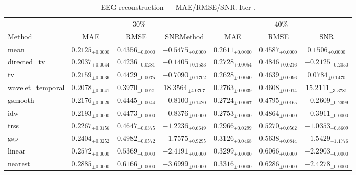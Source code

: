 ﻿%
\begin{table}[ht]
\centering
\caption[EEG reconstruction - Iteration it20]{EEG reconstruction — MAE/RMSE/SNR. Iter .}
\label{tab:main_it20_synthetic_alpha_high_missing}
\small
\begin{tabular}{lcccccc}
\toprule
\multicolumn{1}{c}{} & \multicolumn{3}{c}{30\%} & \multicolumn{3}{c}{40\%} \\
\cmidrule(lr){2-4} \cmidrule(lr){5-7}
Method & MAE & RMSE & SNRMethod & MAE & RMSE & SNR \\
\midrule
mean & $0.2125_{\pm 0.0000}$ & $0.4356_{\pm 0.0000}$ & $-0.5475_{\pm 0.0000}$ & $0.2611_{\pm 0.0000}$ & $0.4587_{\pm 0.0000}$ & $0.1506_{\pm 0.0000}$ \\
directed\_tv & $0.2037_{\pm 0.0044}$ & $0.4236_{\pm 0.0281}$ & $-0.1405_{\pm 0.1533}$ & $0.2728_{\pm 0.0054}$ & $0.4846_{\pm 0.0216}$ & $-0.2125_{\pm 0.2050}$ \\
tv & $0.2159_{\pm 0.0036}$ & $0.4429_{\pm 0.0075}$ & $-0.7090_{\pm 0.1702}$ & $0.2628_{\pm 0.0040}$ & $0.4639_{\pm 0.0096}$ & $0.0784_{\pm 0.1470}$ \\
wavelet\_temporal & $0.2078_{\pm 0.0041}$ & $0.3970_{\pm 0.0021}$ & $18.3564_{\pm 4.0707}$ & $0.2763_{\pm 0.0039}$ & $0.4608_{\pm 0.0014}$ & $15.2111_{\pm 3.3781}$ \\
gsmooth & $0.2176_{\pm 0.0029}$ & $0.4445_{\pm 0.0044}$ & $-0.8100_{\pm 0.1420}$ & $0.2724_{\pm 0.0097}$ & $0.4795_{\pm 0.0165}$ & $-0.2609_{\pm 0.2999}$ \\
idw & $0.2193_{\pm 0.0000}$ & $0.4473_{\pm 0.0000}$ & $-0.8376_{\pm 0.0000}$ & $0.2753_{\pm 0.0000}$ & $0.4864_{\pm 0.0000}$ & $-0.3911_{\pm 0.0000}$ \\
trss & $0.2267_{\pm 0.0156}$ & $0.4647_{\pm 0.0375}$ & $-1.2236_{\pm 0.6649}$ & $0.2966_{\pm 0.0299}$ & $0.5270_{\pm 0.0562}$ & $-1.0353_{\pm 0.8609}$ \\
gsp & $0.2404_{\pm 0.0252}$ & $0.4982_{\pm 0.0572}$ & $-1.7575_{\pm 0.9295}$ & $0.3126_{\pm 0.0468}$ & $0.5638_{\pm 0.0844}$ & $-1.5429_{\pm 1.1776}$ \\
linear & $0.2572_{\pm 0.0000}$ & $0.5369_{\pm 0.0000}$ & $-2.4191_{\pm 0.0000}$ & $0.3299_{\pm 0.0000}$ & $0.6066_{\pm 0.0000}$ & $-2.2903_{\pm 0.0000}$ \\
nearest & $0.2885_{\pm 0.0000}$ & $0.6166_{\pm 0.0000}$ & $-3.6999_{\pm 0.0000}$ & $0.3316_{\pm 0.0000}$ & $0.6286_{\pm 0.0000}$ & $-2.4278_{\pm 0.0000}$ \\

\end{tabular}
\end{table}
